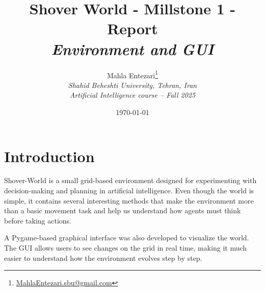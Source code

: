 \documentclass[a4paper]{article}
\date{} %
\begin{document}
\vspace{-1.5cm}



\title{\textbf{Shover World - Millstone 1 - Report}\\
\textit{Environment and GUI}}

\author{Mahla Entezari\thanks{{\href{mailto:MahlaEntezari.sbu@gmail.com}{MahlaEntezari.sbu@gmail.com}}}\\
\textit{Shahid Beheshti University, Tehran, Iran}\\
\textit{Artificial Intelligence course -- Fall 2025}}

\date{\today}


\maketitle


\section{Introduction}

Shover-World is a small grid-based environment designed for experimenting with decision-making and planning in artificial intelligence. Even though the world is simple, it contains several interesting methods that make the environment more than a basic movement task and help us understand how agents must think before taking actions.

A Pygame-based graphical interface was also developed to visualize the world. The GUI allows users to see changes on the grid in real time, making it much easier to understand how the environment evolves step by step.
\end{document}
